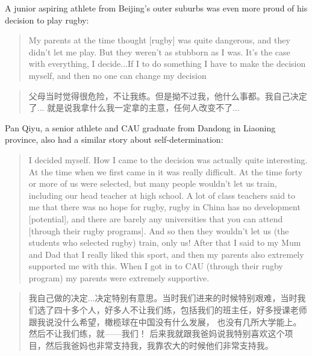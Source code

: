 \begin{CJK}{UTF8}{gbsn}
A junior aspiring athlete from Beijing's outer suburbs was even more proud of his decision to play rugby:

  \begin{quotation}
    My parents at the time thought [rugby] was quite dangerous, and they didn't let me play.  But they weren't as stubborn as I was.  It's the case with everything, I decide...If I to do something I have to make the decision myself, and then no one can change my decision
  \end{quotation}

  \begin{quotation}
    父母当时觉得很危险，不让我练。但是拗不过我，他什么事都。我自己决定了...
    就是说我拿什么我一定拿的主意，任何人改变不了...
  \end{quotation}



  Pan Qiyu, a senior athlete and CAU graduate from Dandong in Liaoning province, also had a similar story about self-determination:

    \begin{quotation}
      I decided myself. How I came to the decision was actually quite interesting.  At the time when we first came in it was really difficult.  At the time forty or more of us were selected, but many people wouldn't let us train, including our head teacher at high school.  A lot of class teachers said to me that there was no hope for rugby, rugby in China has no development [potential], and there are barely any universities that you can attend [through their rugby programs].  And so then they wouldn't let us (the students who selected rugby) train, only us! After that I said to my Mum and Dad that I really liked this sport, and then my parents also extremely supported me with this.  When I got in to CAU (through their rugby program) my parents were extremely supportive.
    \end{quotation}

    \begin{quotation}
      我自己做的决定...决定特别有意思。当时我们进来的时候特别艰难，当时我们选了四十多个人，好多人不让我们练，包括我们的班主任，好多授课老师跟我说没什么希望，橄榄球在中国没有什么发展， 也没有几所大学能上。然后不让我们练，就——我们！ 后来我就跟我爸妈说我特别喜欢这个项目，然后我爸妈也非常支持我，我靠农大的时候他们非常支持我。
    \end{quotation}



\end{CJK}
